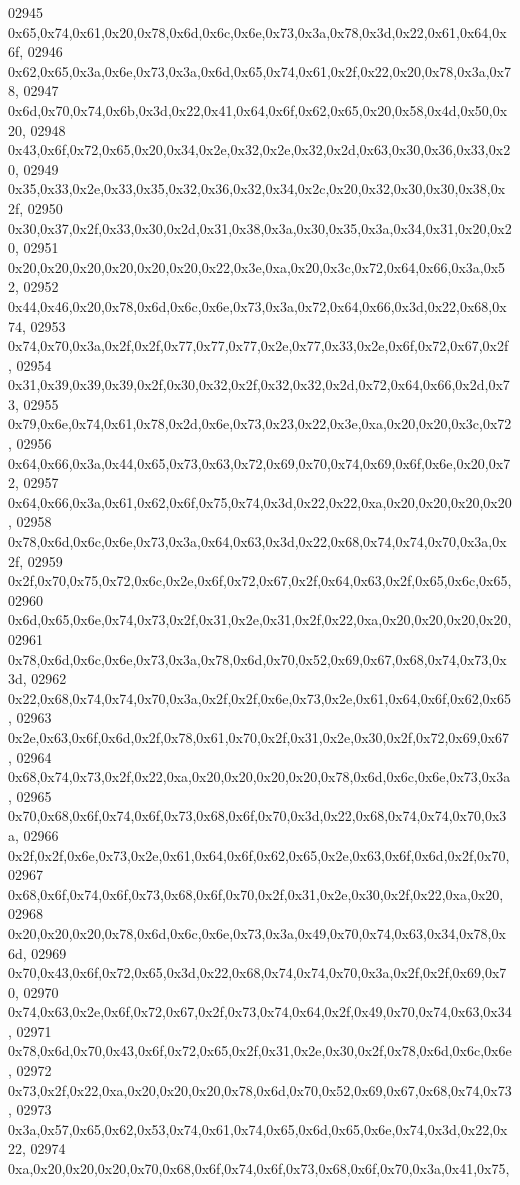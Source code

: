 \begin{DoxyCode}
02945   0x65,0x74,0x61,0x20,0x78,0x6d,0x6c,0x6e,0x73,0x3a,0x78,0x3d,0x22,0x61,0x64,0x6f,
02946   0x62,0x65,0x3a,0x6e,0x73,0x3a,0x6d,0x65,0x74,0x61,0x2f,0x22,0x20,0x78,0x3a,0x78,
02947   0x6d,0x70,0x74,0x6b,0x3d,0x22,0x41,0x64,0x6f,0x62,0x65,0x20,0x58,0x4d,0x50,0x20,
02948   0x43,0x6f,0x72,0x65,0x20,0x34,0x2e,0x32,0x2e,0x32,0x2d,0x63,0x30,0x36,0x33,0x20,
02949   0x35,0x33,0x2e,0x33,0x35,0x32,0x36,0x32,0x34,0x2c,0x20,0x32,0x30,0x30,0x38,0x2f,
02950   0x30,0x37,0x2f,0x33,0x30,0x2d,0x31,0x38,0x3a,0x30,0x35,0x3a,0x34,0x31,0x20,0x20,
02951   0x20,0x20,0x20,0x20,0x20,0x20,0x22,0x3e,0xa,0x20,0x3c,0x72,0x64,0x66,0x3a,0x52,
02952   0x44,0x46,0x20,0x78,0x6d,0x6c,0x6e,0x73,0x3a,0x72,0x64,0x66,0x3d,0x22,0x68,0x74,
02953   0x74,0x70,0x3a,0x2f,0x2f,0x77,0x77,0x77,0x2e,0x77,0x33,0x2e,0x6f,0x72,0x67,0x2f,
02954   0x31,0x39,0x39,0x39,0x2f,0x30,0x32,0x2f,0x32,0x32,0x2d,0x72,0x64,0x66,0x2d,0x73,
02955   0x79,0x6e,0x74,0x61,0x78,0x2d,0x6e,0x73,0x23,0x22,0x3e,0xa,0x20,0x20,0x3c,0x72,
02956   0x64,0x66,0x3a,0x44,0x65,0x73,0x63,0x72,0x69,0x70,0x74,0x69,0x6f,0x6e,0x20,0x72,
02957   0x64,0x66,0x3a,0x61,0x62,0x6f,0x75,0x74,0x3d,0x22,0x22,0xa,0x20,0x20,0x20,0x20,
02958   0x78,0x6d,0x6c,0x6e,0x73,0x3a,0x64,0x63,0x3d,0x22,0x68,0x74,0x74,0x70,0x3a,0x2f,
02959   0x2f,0x70,0x75,0x72,0x6c,0x2e,0x6f,0x72,0x67,0x2f,0x64,0x63,0x2f,0x65,0x6c,0x65,
02960   0x6d,0x65,0x6e,0x74,0x73,0x2f,0x31,0x2e,0x31,0x2f,0x22,0xa,0x20,0x20,0x20,0x20,
02961   0x78,0x6d,0x6c,0x6e,0x73,0x3a,0x78,0x6d,0x70,0x52,0x69,0x67,0x68,0x74,0x73,0x3d,
02962   0x22,0x68,0x74,0x74,0x70,0x3a,0x2f,0x2f,0x6e,0x73,0x2e,0x61,0x64,0x6f,0x62,0x65,
02963   0x2e,0x63,0x6f,0x6d,0x2f,0x78,0x61,0x70,0x2f,0x31,0x2e,0x30,0x2f,0x72,0x69,0x67,
02964   0x68,0x74,0x73,0x2f,0x22,0xa,0x20,0x20,0x20,0x20,0x78,0x6d,0x6c,0x6e,0x73,0x3a,
02965   0x70,0x68,0x6f,0x74,0x6f,0x73,0x68,0x6f,0x70,0x3d,0x22,0x68,0x74,0x74,0x70,0x3a,
02966   0x2f,0x2f,0x6e,0x73,0x2e,0x61,0x64,0x6f,0x62,0x65,0x2e,0x63,0x6f,0x6d,0x2f,0x70,
02967   0x68,0x6f,0x74,0x6f,0x73,0x68,0x6f,0x70,0x2f,0x31,0x2e,0x30,0x2f,0x22,0xa,0x20,
02968   0x20,0x20,0x20,0x78,0x6d,0x6c,0x6e,0x73,0x3a,0x49,0x70,0x74,0x63,0x34,0x78,0x6d,
02969   0x70,0x43,0x6f,0x72,0x65,0x3d,0x22,0x68,0x74,0x74,0x70,0x3a,0x2f,0x2f,0x69,0x70,
02970   0x74,0x63,0x2e,0x6f,0x72,0x67,0x2f,0x73,0x74,0x64,0x2f,0x49,0x70,0x74,0x63,0x34,
02971   0x78,0x6d,0x70,0x43,0x6f,0x72,0x65,0x2f,0x31,0x2e,0x30,0x2f,0x78,0x6d,0x6c,0x6e,
02972   0x73,0x2f,0x22,0xa,0x20,0x20,0x20,0x78,0x6d,0x70,0x52,0x69,0x67,0x68,0x74,0x73,
02973   0x3a,0x57,0x65,0x62,0x53,0x74,0x61,0x74,0x65,0x6d,0x65,0x6e,0x74,0x3d,0x22,0x22,
02974   0xa,0x20,0x20,0x20,0x70,0x68,0x6f,0x74,0x6f,0x73,0x68,0x6f,0x70,0x3a,0x41,0x75,

\end{DoxyCode}

